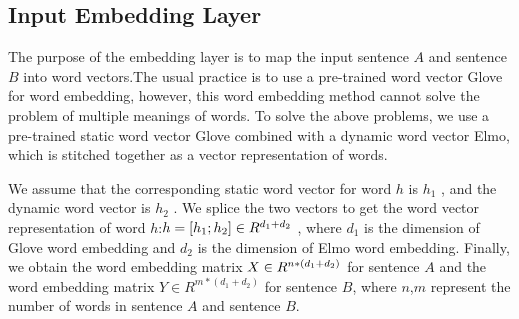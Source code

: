 \documentclass[review]{elsarticle}
\begin{document}
\subsection{Input Embedding Layer}
The purpose of the embedding layer is to map the input sentence $A$ and sentence $B$ into word vectors.The usual practice is to use a pre-trained word vector Glove for word embedding, however, this word embedding method cannot solve the problem of multiple meanings of words. To solve the above problems, we use a pre-trained static word vector Glove combined with a dynamic word vector Elmo, which is stitched together as a vector representation of words\cite{peters2018deep}.

We assume that the corresponding static word vector for word $h$ is ${h_1}$ , and the dynamic word vector is ${h_2}$ . We splice the two vectors to get the word vector representation of word $h$:$h = [{h_{\rm{1}}};{h_{\rm{2}}}] \in {R^{{d_1} + {d_2}}}$ , where ${d_1}$  is the dimension of Glove word embedding and  ${d_2}$ is the dimension of Elmo word embedding. Finally, we obtain the word embedding matrix $X \in {R^{n{\rm{*}}({d_1} + {d_2})}}$ for sentence $A$ and the word embedding matrix $Y \in {R^{m*({d_1} + {d_2})}}$ for sentence $B$, where $n$,$m$ represent the number of words in sentence $A$ and sentence $B$.
\end{document}
